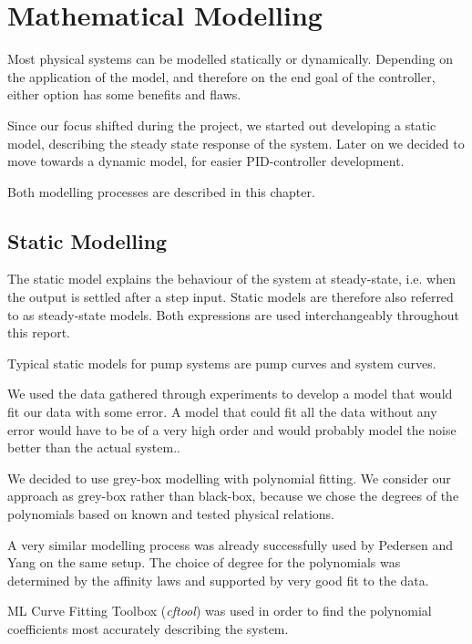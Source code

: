 \chapter{Mathematical Modelling}\label{ch:mathmodel}
Most physical systems can be modelled statically or dynamically.
Depending on the application of the model,
and therefore on the end goal of the controller,
either option has some benefits and flaws.

Since our focus shifted during the project, we started out developing a static model,
describing the steady state response of the system.
Later on we decided to move towards a dynamic model, for easier PID-controller development.

Both modelling processes are described in this chapter.


\section{Static Modelling}\label{sec:statmod}
The static model explains the behaviour of the system at steady-state,
i.e. when the output is settled after a step input.
Static models are therefore also referred to as steady-state models.
Both expressions are used interchangeably throughout this report.

Typical static models for pump systems are pump curves and system curves.

\newpage
We used the data gathered through experiments to develop a model that would fit our data with some error.
A model that could fit all the data without any error would have to be of a very high order
and would probably model the noise better than the actual system..

We decided to use grey-box modelling with polynomial fitting.
We consider our approach as grey-box rather than black-box,
because we chose the degrees of the polynomials based on known and tested physical relations.

A very similar modelling process was already successfully used by Pedersen and Yang 
\cite{YangMultiPump2008} on the same setup.
The choice of degree for the polynomials was determined by the affinity laws \cite{Volk2014}
and supported by very good fit to the data.

ML Curve Fitting Toolbox (\textit{cftool}) \cite{cftool}
was used in order to find the polynomial coefficients most accurately describing the system.

